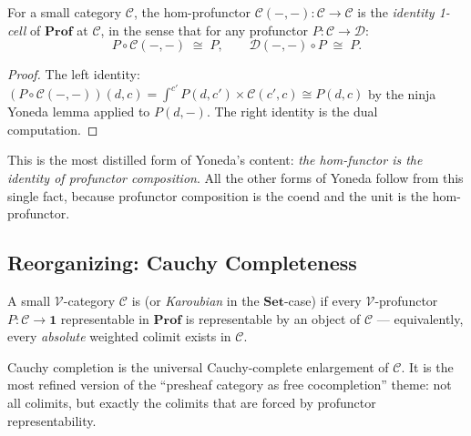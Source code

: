 \begin{theorem}
\label{thm:yoneda-prof}
For a small category $\mathcal{C}$, the hom-profunctor $\mathcal{C}(-, -) :
\mathcal{C} \to \mathcal{C}$ is the \emph{identity 1-cell} of $\mathbf{Prof}$
at $\mathcal{C}$, in the sense that for any profunctor $P : \mathcal{C}
\to \mathcal{D}$:
\begin{equation*}
  P \circ \mathcal{C}(-, -) \;\cong\; P, \qquad \mathcal{D}(-, -) \circ P \;\cong\; P.
\end{equation*}
\end{theorem}

\begin{proof}
The left identity: $(P \circ \mathcal{C}(-,-))(d, c) = \int^{c'} P(d, c')
\times \mathcal{C}(c', c) \cong P(d, c)$ by the ninja Yoneda lemma applied
to $P(d, -)$. The right identity is the dual computation.
\end{proof}

\begin{remark}
This is the most distilled form of Yoneda's content: \emph{the hom-functor
is the identity of profunctor composition}. All the other forms of Yoneda
follow from this single fact, because profunctor composition is the coend
and the unit is the hom-profunctor.
\end{remark}

\subsection{Reorganizing: Cauchy Completeness}

\begin{definition}
\label{def:cauchy-complete}
A small $\mathcal{V}$-category $\mathcal{C}$ is  (or
\emph{Karoubian} in the $\mathbf{Set}$-case) if every $\mathcal{V}$-profunctor
$P : \mathcal{C} \to \mathbf{1}$ representable in $\mathbf{Prof}$ is
representable by an object of $\mathcal{C}$ — equivalently, every \emph{absolute}
weighted colimit exists in $\mathcal{C}$.
\end{definition}

\begin{remark}
Cauchy completion is the universal Cauchy-complete enlargement of $\mathcal{C}$.
It is the most refined version of the ``presheaf category as free cocompletion''
theme: not all colimits, but exactly the colimits that are forced by
profunctor representability.
\end{remark}


